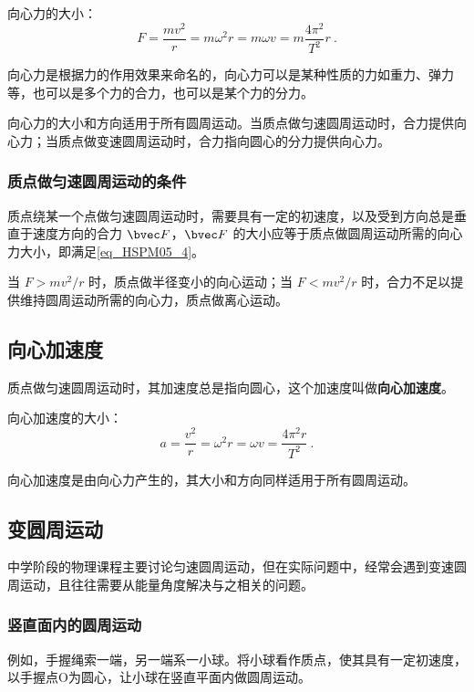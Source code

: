 向心力的大小：
\begin{equation}\label{eq_HSPM05_4}
F=\frac{mv^2}{r}=m\omega^2r=m\omega v=m\frac{4\pi^2}{T^2}r~.
\end{equation}

向心力是根据力的作用效果来命名的，向心力可以是某种性质的力如重力、弹力等，也可以是多个力的合力，也可以是某个力的分力。

向心力的大小和方向适用于所有圆周运动。当质点做匀速圆周运动时，合力提供向心力；当质点做变速圆周运动时，合力指向圆心的分力提供向心力。

\subsubsection{质点做匀速圆周运动的条件}

质点绕某一个点做匀速圆周运动时，需要具有一定的初速度，以及受到方向总是垂直于速度方向的合力 $\bvec F$，$\bvec F$ 的大小应等于质点做圆周运动所需的向心力大小，即满足\autoref{eq_HSPM05_4}。

当 $F>mv^2/r$ 时，质点做半径变小的向心运动；当 $F<mv^2/r$ 时，合力不足以提供维持圆周运动所需的向心力，质点做离心运动。

\subsection{向心加速度}

质点做匀速圆周运动时，其加速度总是指向圆心，这个加速度叫做\textbf{向心加速度}。

向心加速度的大小：
\begin{equation}
a=\frac{v^2}{r}=\omega^2r=\omega v=\frac{4\pi^2r}{T^2}~.
\end{equation}

向心加速度是由向心力产生的，其大小和方向同样适用于所有圆周运动。

\subsection{变圆周运动}
中学阶段的物理课程主要讨论匀速圆周运动，但在实际问题中，经常会遇到变速圆周运动，且往往需要从能量角度解决与之相关的问题。

\subsubsection{竖直面内的圆周运动}
例如，手握绳索一端，另一端系一小球。将小球看作质点，使其具有一定初速度，以手握点O为圆心，让小球在竖直平面内做圆周运动。
